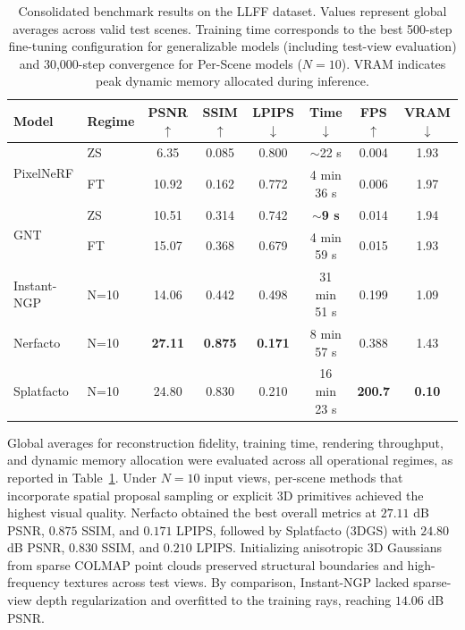 \begin{table}[!t]
\centering
\caption{Consolidated benchmark results on the LLFF dataset. Values represent global averages across valid test scenes. Training time corresponds to the best 500-step fine-tuning configuration for generalizable models (including test-view evaluation) and 30,000-step convergence for Per-Scene models ($N=10$). VRAM indicates peak dynamic memory allocated during inference.}
\label{tab:super_results}
\scriptsize
\setlength{\tabcolsep}{1.8pt}
\begin{tabular*}{\linewidth}{@{\extracolsep{\fill}}llcccccc@{\extracolsep{0pt}}}
\toprule
Model & Regime 
  & PSNR $\uparrow$ 
  & SSIM $\uparrow$ 
  & LPIPS $\downarrow$ 
  & Time $\downarrow$
  & FPS $\uparrow$ 
  & VRAM $\downarrow$ \\
\midrule
\multirow{2}{*}{PixelNeRF}
 & ZS  & 6.35  & 0.085 & 0.800 & $\sim$22 s   & 0.004 & 1.93 \\
 & FT  & 10.92 & 0.162 & 0.772 & 4 min 36 s   & 0.006 & 1.97 \\
\midrule
\multirow{2}{*}{GNT}
 & ZS  & 10.51 & 0.314 & 0.742 & \textbf{$\sim$9 s}    & 0.014 & 1.94 \\
 & FT  & 15.07 & 0.368 & 0.679 & 4 min 59 s   & 0.015 & 1.93 \\
\midrule
Instant-NGP
 & N=10   & 14.06 & 0.442 & 0.498 & 31 min 51 s  & 0.199 & 1.09 \\
\midrule
Nerfacto
 & N=10   & \textbf{27.11} & \textbf{0.875} & \textbf{0.171} & 8 min 57 s   & 0.388 & 1.43 \\
\midrule
Splatfacto
 & N=10   & 24.80 & 0.830 & 0.210 & 16 min 23 s  & \textbf{200.7} & \textbf{0.10} \\
\bottomrule
\end{tabular*}
\end{table}

Global averages for reconstruction fidelity, training time, rendering throughput, and dynamic memory allocation were evaluated across all operational regimes, as reported in Table~\ref{tab:super_results}. Under $N=10$ input views, per-scene methods that incorporate spatial proposal sampling or explicit 3D primitives achieved the highest visual quality. Nerfacto obtained the best overall metrics at $27.11$ dB PSNR, $0.875$ SSIM, and $0.171$ LPIPS, followed by Splatfacto (3DGS) with $24.80$ dB PSNR, $0.830$ SSIM, and $0.210$ LPIPS. Initializing anisotropic 3D Gaussians from sparse COLMAP point clouds preserved structural boundaries and high-frequency textures across test views. By comparison, Instant-NGP lacked sparse-view depth regularization and overfitted to the training rays, reaching $14.06$ dB PSNR.

